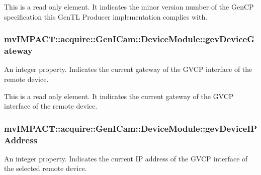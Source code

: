 This is a read only element. It indicates the minor version number of the Gen\+C\+P specification this Gen\+T\+L Producer implementation complies with. \hypertarget{classmv_i_m_p_a_c_t_1_1acquire_1_1_gen_i_cam_1_1_device_module_aa331900f06d6838f4d1e11bf2355afb2}{
\subsubsection[{gev\+Device\+Gateway}]{ mv\+I\+M\+P\+A\+C\+T\+::acquire\+::\+Gen\+I\+Cam\+::\+Device\+Module\+::gev\+Device\+Gateway}}\label{classmv_i_m_p_a_c_t_1_1acquire_1_1_gen_i_cam_1_1_device_module_aa331900f06d6838f4d1e11bf2355afb2}


An integer property. Indicates the current gateway of the G\+V\+C\+P interface of the remote device. 

This is a read only element. It indicates the current gateway of the G\+V\+C\+P interface of the remote device. \hypertarget{classmv_i_m_p_a_c_t_1_1acquire_1_1_gen_i_cam_1_1_device_module_aca13ae83a961849ca45b359a7b477d2b}{
\subsubsection[{gev\+Device\+I\+P\+Address}]{ mv\+I\+M\+P\+A\+C\+T\+::acquire\+::\+Gen\+I\+Cam\+::\+Device\+Module\+::gev\+Device\+I\+P\+Address}}\label{classmv_i_m_p_a_c_t_1_1acquire_1_1_gen_i_cam_1_1_device_module_aca13ae83a961849ca45b359a7b477d2b}


An integer property. Indicates the current I\+P address of the G\+V\+C\+P interface of the selected remote device. 

